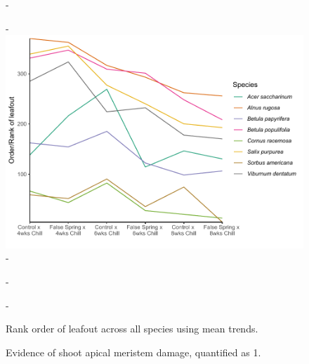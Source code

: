 \documentclass{article}\usepackage[]{graphicx}\usepackage[]{color}
\begin{document}
{\begin{figure} [H]
  -\begin{center}
  -\includegraphics[width=12cm]{..//analyses/figures/budsetorder_byrank.pdf} 
  -\caption{Rank order of leafout across all species using mean trends. }\label{fig:bsetrank}
  -\end{center}
  -\end{figure}}




{\begin{figure}[H]
    \centering
    \begin{turn}{90}
    \end{turn}
    \qquad
    \begin{turn}{90}
    \end{turn}
    \caption{Evidence of shoot apical meristem damage, quantified as 1.}
    \label{fig:damage}
\end{figure}}
\end{document}
